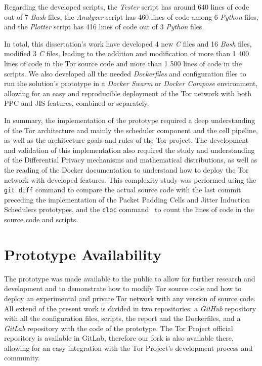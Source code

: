 Regarding the developed scripts, the \textit{Tester} script has around 640 lines of code out of 7 \textit{Bash} files, the \textit{Analyzer} script has 460 lines of code among 6 \textit{Python} files, and the \textit{Plotter} script has 416 lines of code out of 3 \textit{Python} files.

In total, this dissertation's work have developed 4 new \textit{C} files and 16 \textit{Bash} files, modified 3 \textit{C} files, leading to the addition and modification of more than 1 400 lines of code in the Tor source code and more than 1 500 lines of code in the scripts. We also developed all the needed \textit{Dockerfiles} and configuration files to run the solution's prototype in a \textit{Docker Swarm} or \textit{Docker Compose} environment, allowing for an easy and reproducible deployment of the Tor network with both PPC and JIS features, combined or separately.

In summary, the implementation of the prototype required a deep understanding of the Tor architecture and mainly the scheduler component and the cell pipeline, as well as the architecture goals and rules of the Tor project. The development and validation of this implementation also required the study and understanding of the Differential Privacy mechanisms and mathematical distributions, as well as the reading of the Docker documentation to understand how to deploy the Tor network with developed features. This complexity study was performed using the \texttt{git diff} command to compare the actual source code with the last commit preceding the implementation of the Packet Padding Cells and Jitter Induction Schedulers prototypes, and the \texttt{cloc} command~\cite{adanial_cloc} to count the lines of code in the source code and scripts. 


\section{Prototype Availability}\label{sec:prototype_availability}

The prototype was made available to the public to allow for further research and development and to demonstrate how to modify Tor source code and how to deploy an experimental and private Tor network with any version of source code. All  extend of the present work is divided in two repositories: a \textit{GitHub} repository with all the configuration files, scripts, the report and the Dockerfiles, and a \textit{GitLab} repository with the code of the prototype. The Tor Project official repository is available in GitLab, therefore our fork is also available there, allowing for an easy integration with the Tor Project's development process and community.

